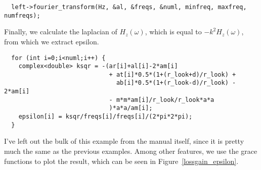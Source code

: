 \begin{verbatim}
  left->fourier_transform(Hz, &al, &freqs, &numl, minfreq, maxfreq, numfreqs);
\end{verbatim}
\begin{comment}
  delete[] freqs;
  printf("Working on middle fourier transform...\n");
  middle->fourier_transform(Hz, &am, &freqs, &numr, minfreq, maxfreq, numfreqs);
  delete[] freqs;
  printf("Working on top fourier transform...\n");
  top->fourier_transform(Hz, &at, &freqs, &numr, minfreq, maxfreq, numfreqs);
  delete[] freqs;
  printf("Working on bottom fourier transform...\n");
  bottom->fourier_transform(Hz, &ab, &freqs, &numr, minfreq, maxfreq, numfreqs);
  delete[] freqs;
  printf("Working on right fourier transform...\n");
  right->fourier_transform(Hz, &ar, &freqs, &numr, minfreq, maxfreq, numfreqs);
  if (numl != numr) printf("Aaack you need both nums to be the same!\n");
  g.new_set();
  g.set_legend("\\x\\e\\s1\\N");
  complex<double> *epsilon = new complex<double>[numl];
\end{comment}

Finally, we calculate the laplacian of $H_z(\omega)$, which is equal to
$-k^2 H_z(\omega)$, from which we extract epsilon.

\begin{verbatim}
  for (int i=0;i<numl;i++) {
    complex<double> ksqr = -(ar[i]+al[i]-2*am[i]
                             + at[i]*0.5*(1+(r_look+d)/r_look) +
                               ab[i]*0.5*(1+(r_look-d)/r_look) - 2*am[i]
                             - m*m*am[i]/r_look/r_look*a*a
                             )*a*a/am[i];
    epsilon[i] = ksqr/freqs[i]/freqs[i]/(2*pi*2*pi);
  }
\end{verbatim}

I've left out the bulk of this example from the manual itself, since it
is pretty much the same as the previous examples.  Among other features, we
use the grace functions to plot the result, which can be seen in
Figure~\ref{lossgain_epsilon}.

